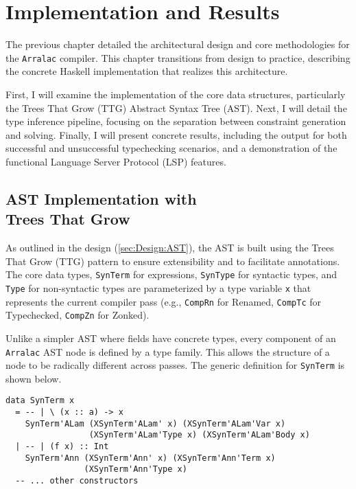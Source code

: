 \chapter{Implementation and Results}
\label{chap:ImplementationAndResults}

The previous chapter detailed the architectural design and core methodologies for the \texttt{Arralac} compiler. This chapter transitions from design to practice, describing the concrete Haskell implementation that realizes this architecture.

First, I will examine the implementation of the core data structures, particularly the Trees That Grow (TTG) Abstract Syntax Tree (AST). Next, I will detail the type inference pipeline, focusing on the separation between constraint generation and solving. Finally, I will present concrete results, including the output for both successful and unsuccessful typechecking scenarios, and a demonstration of the functional Language Server Protocol (LSP) features.

\section{AST Implementation with \\ Trees That Grow}
\label{sec:Implementation:AST}

As outlined in the design (\cref{sec:Design:AST}), the AST is built using the Trees That Grow (TTG) pattern to ensure extensibility and to facilitate annotations. The core data types, \texttt{SynTerm} for expressions, \texttt{SynType} for syntactic types, and \texttt{Type} for non-syntactic types are parameterized by a type variable \texttt{x} that represents the current compiler pass (e.g., \texttt{CompRn} for Renamed, \texttt{CompTc} for Typechecked, \texttt{CompZn} for Zonked).

Unlike a simpler AST where fields have concrete types, every component of an \texttt{Arralac} AST node is defined by a type family. This allows the structure of a node to be radically different across passes. The generic definition for \texttt{SynTerm} is shown below.

\begin{verbatim}
data SynTerm x
  = -- | \ (x :: a) -> x
    SynTerm'ALam (XSynTerm'ALam' x) (XSynTerm'ALam'Var x) 
                 (XSynTerm'ALam'Type x) (XSynTerm'ALam'Body x)
  | -- | (f x) :: Int
    SynTerm'Ann (XSynTerm'Ann' x) (XSynTerm'Ann'Term x) 
                (XSynTerm'Ann'Type x)
  -- ... other constructors
\end{verbatim}

